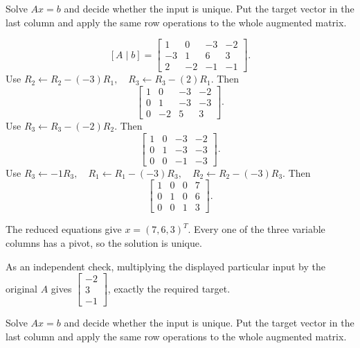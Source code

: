 \goal Solve $Ax=b$ and decide whether the input is unique. Put the target vector in the last column and apply the same row operations to the whole augmented matrix.

\[ [A\mid b]=\begin{bmatrix}1 & 0 & -3 & -2\\-3 & 1 & 6 & 3\\2 & -2 & -1 & -1\end{bmatrix}.\]
Use $R_{2}\leftarrow R_{2}-(-3)R_{1},\quad R_{3}\leftarrow R_{3}-(2)R_{1}$. Then
\[ \begin{bmatrix}1 & 0 & -3 & -2\\0 & 1 & -3 & -3\\0 & -2 & 5 & 3\end{bmatrix}.\]
Use $R_{3}\leftarrow R_{3}-(-2)R_{2}$. Then
\[ \begin{bmatrix}1 & 0 & -3 & -2\\0 & 1 & -3 & -3\\0 & 0 & -1 & -3\end{bmatrix}.\]
Use $R_{3}\leftarrow -1R_{3},\quad R_{1}\leftarrow R_{1}-(-3)R_{3},\quad R_{2}\leftarrow R_{2}-(-3)R_{3}$. Then
\[ \begin{bmatrix}1 & 0 & 0 & 7\\0 & 1 & 0 & 6\\0 & 0 & 1 & 3\end{bmatrix}.\]

The reduced equations give $x=(7,6,3)^T$. Every one of the three variable columns has a pivot, so the solution is unique.

As an independent check, multiplying the displayed particular input by the original $A$ gives $\begin{bmatrix}-2\\3\\-1\end{bmatrix}$, exactly the required target.



\goal Solve $Ax=b$ and decide whether the input is unique. Put the target vector in the last column and apply the same row operations to the whole augmented matrix.

